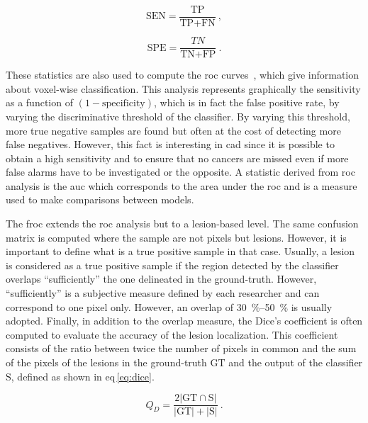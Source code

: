 \begin{equation}
  \text{SEN} = \frac{\text{TP}}{\text{TP} + \text{FN}} \ ,
  \label{eq:sens}
\end{equation}

\begin{equation}
  \text{SPE} = \frac{TN}{\text{TN} + \text{FP}} \ .
  \label{eq:spec}
\end{equation}

These statistics are also used to compute the \ac{roc} curves~\cite{Metz2006}, which give information about voxel-wise classification.
This analysis represents graphically the sensitivity as a function of $(1 - \text{specificity})$, which is in fact the false positive rate, by varying the discriminative threshold of the classifier.
By varying this threshold, more true negative samples are found but often at the cost of detecting more false negatives.
However, this fact is interesting in \ac{cad} since it is possible to obtain a high sensitivity and to ensure that no cancers are missed even if more false alarms have to be investigated or the opposite.
A statistic derived from \ac{roc} analysis is the \acf{auc} which corresponds to the area under the \ac{roc} and is a measure used to make comparisons between models.

The \acf{froc} extends the \ac{roc} analysis but to a lesion-based level.
The same confusion matrix is computed where the sample are not pixels but lesions.
However, it is important to define what is a true positive sample in that case.
Usually, a lesion is considered as a true positive sample if the region detected by the classifier overlaps ``sufficiently'' the one delineated in the ground-truth.
However, ``sufficiently'' is a subjective measure defined by each researcher and can correspond to one pixel only.
However, an overlap of \SIrange{30}{50}{\percent} is usually adopted.
Finally, in addition to the overlap measure, the Dice's coefficient is often computed to evaluate the accuracy of the lesion localization.
This coefficient consists of the ratio between twice the number of pixels in common and the sum of the pixels of the lesions in the ground-truth $\text{GT}$ and the output of the classifier $\text{S}$, defined as shown in \acs{eq}\,\eqref{eq:dice}.

\begin{equation}
  Q_D = \frac{2 | \text{GT} \cap \text{S} |}{| \text{GT} | + | \text{S} |} \ .
  \label{eq:dice}
\end{equation}
